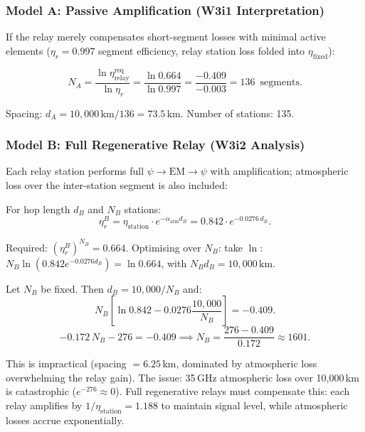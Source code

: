 \documentclass[aps,prd,twocolumn,superscriptaddress]{revtex4-2}
\begin{document}
\subsubsection{Model A: Passive Amplification (W3i1 Interpretation)}

If the relay merely compensates short-segment losses with minimal
active elements ($\eta_r = 0.997$ segment efficiency, relay station
loss folded into $\eta_\mathrm{fixed}$):

\begin{equation}
N_A = \frac{\ln\eta_\mathrm{relay}^\mathrm{req}}{\ln\eta_r}
= \frac{\ln 0.664}{\ln 0.997}
= \frac{-0.409}{-0.003} = 136\,\text{ segments}.
\end{equation}

Spacing: $d_A = 10{,}000\,\mathrm{km}/136 = 73.5\,\mathrm{km}$.
Number of stations: 135.

\subsubsection{Model B: Full Regenerative Relay (W3i2 Analysis)}

Each relay station performs full $\psi\to\mathrm{EM}\to\psi$ with
amplification; atmospheric loss over the inter-station segment is
also included:

For hop length $d_B$ and $N_B$ stations:
\begin{equation}
\eta_r^B = \eta_\mathrm{station}\cdot e^{-\alpha_\mathrm{atm}d_B}
= 0.842\cdot e^{-0.0276\,d_B}.
\end{equation}

Required: $(\eta_r^B)^{N_B} = 0.664$.
Optimising over $N_B$: take $\ln$:
$N_B\ln(0.842 e^{-0.0276 d_B}) = \ln 0.664$,
with $N_B d_B = 10{,}000\,\mathrm{km}$.

Let $N_B$ be fixed.  Then $d_B = 10{,}000/N_B$ and:
\begin{equation}
N_B\left[\ln 0.842 - 0.0276\frac{10{,}000}{N_B}\right] = -0.409.
\end{equation}
\begin{equation}
-0.172\,N_B - 276 = -0.409 \implies N_B = \frac{276 - 0.409}{0.172} \approx 1601.
\end{equation}

This is impractical (spacing $= 6.25\,\mathrm{km}$, dominated by
atmospheric loss overwhelming the relay gain).  The issue: 35\,GHz
atmospheric loss over 10,000\,km is catastrophic ($e^{-276}\approx 0$).
Full regenerative relays must compensate this: each relay amplifies
by $1/\eta_\mathrm{station} = 1.188$ to maintain signal level, while
atmospheric losses accrue exponentially.
\end{document}

